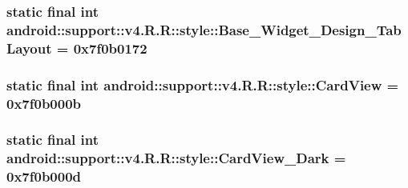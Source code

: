 \hypertarget{classandroid_1_1support_1_1v4_1_1_r_1_1style_424cb09c2dbf4c514049d88bfcf97c39}{
\subsubsection[{Base\_\-Widget\_\-Design\_\-TabLayout}]{\setlength{\rightskip}{0pt plus 5cm}static final int android::support::v4.R.R::style::Base\_\-Widget\_\-Design\_\-TabLayout = 0x7f0b0172}}
\label{classandroid_1_1support_1_1v4_1_1_r_1_1style_424cb09c2dbf4c514049d88bfcf97c39}


\hypertarget{classandroid_1_1support_1_1v4_1_1_r_1_1style_589da6dcbb76ceb0d634c59b109674b2}{
\subsubsection[{CardView}]{\setlength{\rightskip}{0pt plus 5cm}static final int android::support::v4.R.R::style::CardView = 0x7f0b000b}}
\label{classandroid_1_1support_1_1v4_1_1_r_1_1style_589da6dcbb76ceb0d634c59b109674b2}


\hypertarget{classandroid_1_1support_1_1v4_1_1_r_1_1style_1f3d6a121d4e5415251c3bfde9031b5f}{
\subsubsection[{CardView\_\-Dark}]{\setlength{\rightskip}{0pt plus 5cm}static final int android::support::v4.R.R::style::CardView\_\-Dark = 0x7f0b000d}}
\label{classandroid_1_1support_1_1v4_1_1_r_1_1style_1f3d6a121d4e5415251c3bfde9031b5f}


